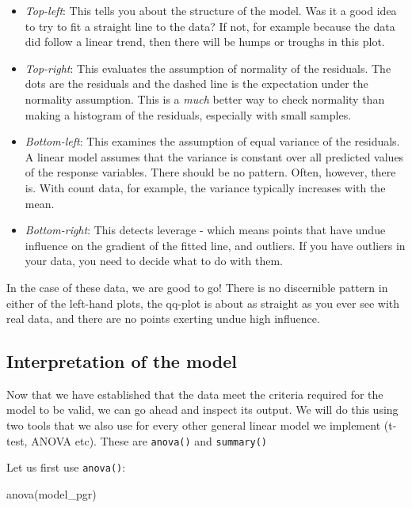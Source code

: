 \documentclass[
  letterpaper,
  DIV=11,
  numbers=noendperiod]{scrreprt}
\newenvironment{Shaded}{\begin{snugshade}}{\end{snugshade}}
\newcommand{\FunctionTok}[1]{\textcolor[rgb]{0.28,0.35,0.67}{#1}}
\newcommand{\NormalTok}[1]{\textcolor[rgb]{0.00,0.23,0.31}{#1}}
\providecommand{\tightlist}{%
  \setlength{\itemsep}{0pt}\setlength{\parskip}{0pt}}\usepackage{longtable,booktabs,array}
\begin{document}
\begin{itemize}
\tightlist
\item
  \emph{Top-left}: This tells you about the structure of the model. Was
  it a good idea to try to fit a straight line to the data? If not, for
  example because the data did follow a linear trend, then there will be
  humps or troughs in this plot.
\item
  \emph{Top-right}: This evaluates the assumption of normality of the
  residuals. The dots are the residuals and the dashed line is the
  expectation under the normality assumption. This is a \emph{much}
  better way to check normality than making a histogram of the
  residuals, especially with small samples.
\item
  \emph{Bottom-left}: This examines the assumption of equal variance of
  the residuals. A linear model assumes that the variance is constant
  over all predicted values of the response variables. There should be
  no pattern. Often, however, there is. With count data, for example,
  the variance typically increases with the mean.
\item
  \emph{Bottom-right}: This detects leverage - which means points that
  have undue influence on the gradient of the fitted line, and outliers.
  If you have outliers in your data, you need to decide what to do with
  them.
\end{itemize}

In the case of these data, we are good to go! There is no discernible
pattern in either of the left-hand plots, the qq-plot is about as
straight as you ever see with real data, and there are no points
exerting undue high influence.

\subsection{Interpretation of the
model}\label{interpretation-of-the-model}

Now that we have established that the data meet the criteria required
for the model to be valid, we can go ahead and inspect its output. We
will do this using two tools that we also use for every other general
linear model we implement (t-test, ANOVA etc). These are
\texttt{anova()} and \texttt{summary()}

Let us first use \texttt{anova()}:

\begin{Shaded}
\begin{Highlighting}[]
\FunctionTok{anova}\NormalTok{(model\_pgr)}
\end{Highlighting}
\end{Shaded}
\end{document}
